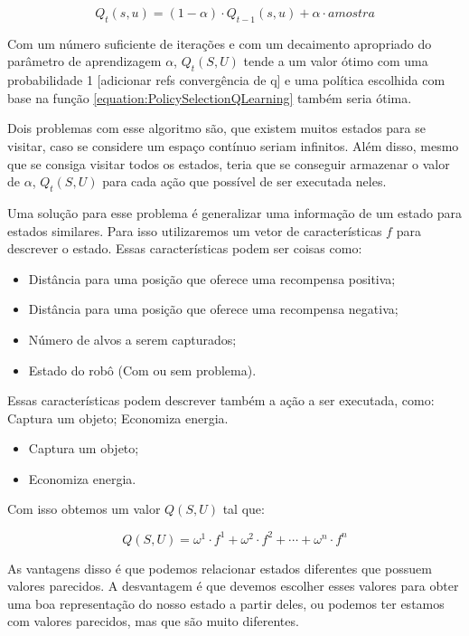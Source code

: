 \begin{equation}
	Q_t \left( s, u \right) = \left( 1 - \alpha \right) \cdot Q_{t-1} \left( s, u \right) + \alpha \cdot amostra
\end{equation}

Com um número suficiente de iterações e com um decaimento apropriado do parâmetro de aprendizagem $ \alpha $, $ Q_t \left( S, U \right) $ tende a um valor ótimo  com uma probabilidade 1 [adicionar refs convergência de q] e uma política escolhida com base na função \ref{equation:PolicySelectionQLearning} também seria ótima.

Dois problemas com esse algoritmo são, que existem muitos estados para se visitar, caso se considere um espaço contínuo seriam infinitos. Além disso, mesmo que se consiga visitar todos os estados, teria que se conseguir armazenar o valor de $ \alpha $, $ Q_t \left( S, U \right) $ para cada ação que possível de ser executada neles.

Uma solução para esse problema é generalizar uma informação de um estado para estados similares. Para isso utilizaremos um vetor de características $ f $ para descrever o estado. Essas características podem ser coisas como:

\begin{itemize}
	\item Distância para uma posição que oferece uma recompensa positiva;
	\item Distância para uma posição que oferece uma recompensa negativa;
	\item Número de alvos a serem capturados;
	\item Estado do robô (Com ou sem problema).
\end{itemize}

Essas características podem descrever também a ação a ser executada, como:
Captura um objeto;
Economiza energia.

\begin{itemize}
	\item Captura um objeto;
	\item Economiza energia.
\end{itemize}

Com isso obtemos um valor $ Q \left( S, U \right) $ tal que:

\begin{equation}
	Q \left( S, U \right) = \omega^1 \cdot f^1 + \omega^2 \cdot f^2 + \cdots + \omega^n \cdot f^n
\end{equation}

As vantagens disso é que podemos relacionar estados diferentes que possuem valores parecidos. A desvantagem é que devemos escolher esses valores para obter uma boa representação do nosso estado a partir deles, ou podemos ter estamos com valores parecidos, mas que são muito diferentes.


